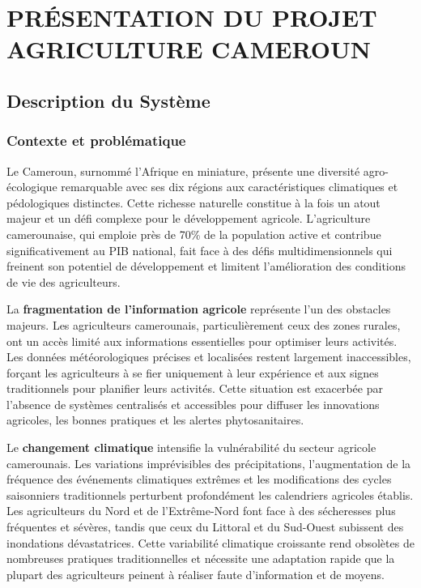 \chapter{PRÉSENTATION DU PROJET AGRICULTURE CAMEROUN}


\section{Description du Système}

\subsection{Contexte et problématique}

Le Cameroun, surnommé l'Afrique en miniature, présente une diversité agro-écologique remarquable avec ses dix régions aux caractéristiques climatiques et pédologiques distinctes. Cette richesse naturelle constitue à la fois un atout majeur et un défi complexe pour le développement agricole. L'agriculture camerounaise, qui emploie près de 70\% de la population active et contribue significativement au PIB national, fait face à des défis multidimensionnels qui freinent son potentiel de développement et limitent l'amélioration des conditions de vie des agriculteurs.

La \textbf{fragmentation de l'information agricole} représente l'un des obstacles majeurs. Les agriculteurs camerounais, particulièrement ceux des zones rurales, ont un accès limité aux informations essentielles pour optimiser leurs activités. Les données météorologiques précises et localisées restent largement inaccessibles, forçant les agriculteurs à se fier uniquement à leur expérience et aux signes traditionnels pour planifier leurs activités. Cette situation est exacerbée par l'absence de systèmes centralisés et accessibles pour diffuser les innovations agricoles, les bonnes pratiques et les alertes phytosanitaires.

Le \textbf{changement climatique} intensifie la vulnérabilité du secteur agricole camerounais. Les variations imprévisibles des précipitations, l'augmentation de la fréquence des événements climatiques extrêmes et les modifications des cycles saisonniers traditionnels perturbent profondément les calendriers agricoles établis. Les agriculteurs du Nord et de l'Extrême-Nord font face à des sécheresses plus fréquentes et sévères, tandis que ceux du Littoral et du Sud-Ouest subissent des inondations dévastatrices. Cette variabilité climatique croissante rend obsolètes de nombreuses pratiques traditionnelles et nécessite une adaptation rapide que la plupart des agriculteurs peinent à réaliser faute d'information et de moyens.

